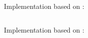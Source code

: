 Implementation based on :
\inputminted{csharp}{\context/answer/while/TemperatureConverterWhile.cs}

Implementation based on :
\inputminted{csharp}{\context/answer/dowhile/TemperatureConverterDoWhile.cs}


